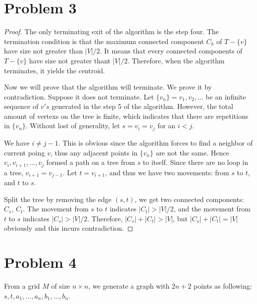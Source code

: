 \documentclass{report}
\begin{document}
    \section*{Problem 3}
    \begin{proof}
    The only terminating exit of the algorithm is the step four. The termination condition
    is that the maximum connected component $C_k$ of $T - \{v\}$ have size not greater 
    than $|V| / 2$. It means that every connected components of $T - \{v\}$ have size 
    not greater thant $|V| / 2$. Therefore, when the algorithm terminates, it yields the 
    centroid.

    Now we will prove that the algorithm will terminate. We prove it by contradiction. 
    Suppose it does not terminate. Let $\{v_n\} = v_1, v_2, \ldots$ be an infinite 
    sequence of $v's$ generated in the step 5 of the algorithm. However, the total 
    amount of vertexs on the tree is finite, which indicates that there are repetitions
    in $\{v_n\}$. Without lost of generality, let $s = v_i = v_j$ for an $i < j$. 

    We have $i \neq j - 1$. This is obvious since the algorithm forces to find a neighbor 
    of current poing $v$, thus any adjacent points in $\{v_n\}$ are not the same. Hence 
    $v_i, v_{i+1}, \ldots, v_j$ formed a path on a tree from $s$ to itself. Since there 
    are no loop in a tree, $v_{i+1} = v_{j-1}$. Let $t = v_{i+1}$, and thus we have two
    movements: from $s$ to $t$, and $t$ to $s$.

    Split the tree by removing the edge $(s, t)$, we get two connected components:
    $C_s$, $C_t$. The movement from $s$ to $t$ indicates $|C_t| > |V| / 2$, and the 
    movement from $t$ to $s$ indicates $|C_s| > |V| / 2$. Therefore, $|C_s| + |C_t| > |V|$,
    but $|C_s| + |C_t| = |V|$ obviously and this incurs contradiction.
    \end{proof}

    \section*{Problem 4}
    From a grid $M$ of size $n \times n$, we generate a graph with $2n+2$ points as 
    following: $s, t, a_1, \ldots, a_n, b_1, \ldots, b_n$.
\end{document}
